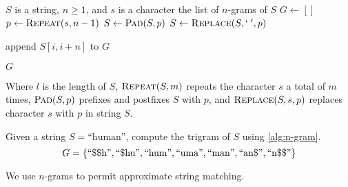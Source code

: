 
		\begin{algorithm}[H]
			\caption{\(\textsc{N-Gram}(S, n, s)\)}
			\label{alg:n-gram}
			
			\begin{singlespaced}
				\begin{algorithmic}[1]
					\REQUIRE \(S\) is a string, \(n \ge 1\), and \(s\) is a character
					\ENSURE the list of \(n\)-grams of \(S\)
					\medskip
					\STATE \(G \leftarrow []\)\label{alg:n-gram:G}
					\STATE \(p \leftarrow \textsc{Repeat}(s, n - 1)\)
					\STATE \(S \leftarrow \textsc{Pad}(S, p)\)
					\STATE \(S \leftarrow \textsc{Replace}(S, `\;', p)\)\label{alg:n-gram:S}
					
						\STATE append \(S[i, i + n]\) to \(G\)
					\ENDFOR
					
					\RETURN \(G\)
					\medskip
					\medskip
				\end{algorithmic}
			\end{singlespaced}
		\end{algorithm}
		
		
		Where \(l\) is the length of \(S\), \(\textsc{Repeat}(S, m)\) repeats the character \(s\) a total of \(m\) times, \(\textsc{Pad}(S, p)\) prefixes and postfixes \(S\) with \(p\), and \(\textsc{Replace}(S, s, p)\) replaces character \(s\) with \(p\) in string \(S\).
		
		\begin{ex}
		\label{ex:ngram}
			Given a string \(S = \text{``human''}\), compute the trigram of \(S\) using \cref{alg:n-gram}.
			\[
				G = \{
					\text{``\char"24\char"24h''},
					\text{``\char"24hu''},
					\text{``hum''},
					\text{``uma''},
					\text{``man''},
					\text{``an\char"24''},
					\text{``n\char"24\char"24''}
				\}
			\]
		\end{ex}
		
		We use \(n\)-grams to permit approximate string matching.
		

